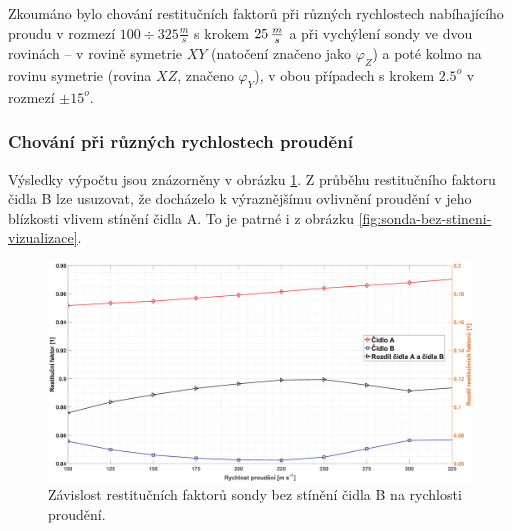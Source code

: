         Zkoumáno bylo chování restitučních faktorů při různých rychlostech nabíhajícího proudu v rozmezí $100 \div 325 \unit{\frac{m}{s}}$ s krokem $25 \, \frac{m}{s}$ a při vychýlení sondy ve dvou rovinách – v rovině symetrie $XY$ (natočení značeno jako $\varphi _Z$) a poté kolmo na rovinu symetrie (rovina $XZ$, značeno $\varphi _Y$), v obou případech s krokem $2.5^o$ v rozmezí $\pm 15^o$.
        
        \newpage
        \subsubsection{Chování při různých rychlostech proudění}
            Výsledky výpočtu jsou znázorněny v obrázku \ref{fig:sonda-bez-stineni-rychlosti}. Z průběhu restitučního faktoru čidla B lze usuzovat, že docházelo k výraznějšímu ovlivnění proudění v jeho blízkosti vlivem stínění čidla A. To je patrné i z obrázku \ref{fig:sonda-bez-stineni-vizualizace}. 
            
            \begin{figure}[ht!]
                \centering
                \includegraphics*[width=\textwidth]{400_SIMULACE_KONSTRUKCNICH_UPRAV/Grafy/01_rychlosti.eps}
                \caption{Závislost restitučních faktorů sondy bez stínění čidla B na rychlosti proudění.}
                \label{fig:sonda-bez-stineni-rychlosti}
            \end{figure}

